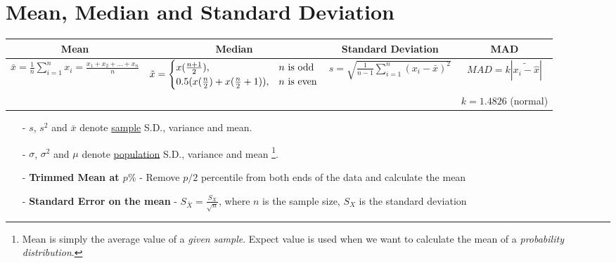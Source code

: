 \documentclass{article}
\begin{document}

\section{Mean, Median and Standard Deviation}

\begin{table}[H]
    \centering
    \begin{adjustbox}{width=\columnwidth,center}
    \begin{tabular}{c| c| c | c}
        Mean & Median & Standard Deviation & MAD\\ [0.7ex] \hline 
        $\displaystyle \bar{x}=\frac{1}{n}\sum_{i=1}^{n}x_{i} = \frac{x_{1}+x_{2}+...+x_{n}}{n}$ & 
        $\Tilde{x} = \begin{cases} 
        x(\frac{n+1}{2}), & n \ \text{is odd} \\
        0.5(x(\frac{n}{2})+x(\frac{n}{2}+1)), & n \ \text{is even}
        \end{cases}$ &
        $\displaystyle s = \sqrt{\frac{1}{n-1}\sum_{i=1}^{n} (x_{i}-\bar{x})^{2}}$
        & $\displaystyle MAD = k|\widetilde{x_{i} - \hat{x}}|$ \\
          &  &  &  $k = 1.4826$ \footnotesize{(normal)}\\
    \end{tabular}
    \end{adjustbox}
\end{table}

\begin{itemize}
    \item[-] $s$, $s^{2}$ and $\bar{x}$ denote \underline{sample} S.D., variance and mean.
    \item[-] $\sigma$, $\sigma^{2}$ and $\mu$ denote \underline{population} S.D., variance and mean \footnote{Mean is simply the average value of a \textit{given sample}. Expect value is used when we want to calculate the mean of a \textit{probability distribution}.}.\\
    
    \item[-] \textbf{Trimmed Mean at $p\%$} - Remove $p/2$ percentile from both ends of the data and calculate the mean
    \item[-] \textbf{Standard Error on the mean} - 
    $\displaystyle S_{\bar{X}} = \frac{S_{X}}{\sqrt{n}}$, where $n$ is the sample size, $S_{X}$ is the standard deviation
\end{itemize}
\end{document}
